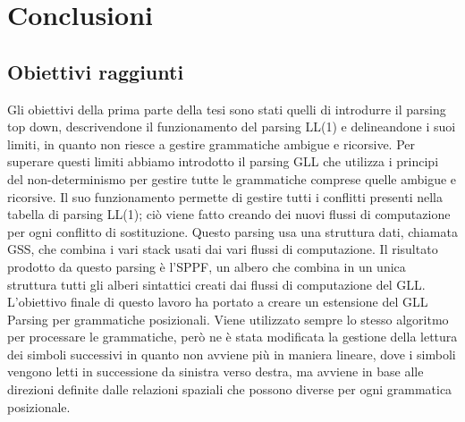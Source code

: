 \chapter{Conclusioni}
\section{Obiettivi raggiunti}
Gli obiettivi della prima parte della tesi sono stati quelli di introdurre il parsing top down, descrivendone il funzionamento del parsing LL(1) e delineandone i suoi limiti, in quanto non riesce a gestire grammatiche ambigue e ricorsive. Per superare questi limiti abbiamo introdotto il parsing GLL che utilizza i principi del non-determinismo per gestire tutte le grammatiche comprese quelle ambigue e ricorsive. Il suo funzionamento permette di gestire tutti i conflitti presenti nella tabella di parsing LL(1); ciò viene fatto creando dei nuovi flussi di computazione per ogni conflitto di sostituzione. Questo parsing usa una struttura dati, chiamata GSS, che combina i vari stack usati dai vari flussi di computazione. Il risultato prodotto da questo parsing è l'SPPF, un albero che combina in un unica struttura tutti gli alberi sintattici creati dai flussi di computazione del GLL. L'obiettivo finale di questo lavoro ha portato a creare un estensione del GLL Parsing per grammatiche posizionali. Viene utilizzato sempre lo stesso algoritmo per processare le grammatiche, però ne è stata modificata la gestione della lettura dei simboli successivi in quanto non avviene più in maniera lineare, dove i simboli vengono letti in successione da sinistra verso destra, ma avviene in base alle direzioni definite dalle relazioni spaziali che possono diverse per ogni grammatica posizionale.